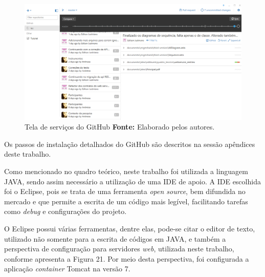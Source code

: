 
\begin{figure}[h!]
	\centerline{\includegraphics[scale=0.35]{./imagens/github.jpg}}
	\caption[Tela de serviços do GitHub ]
	{Tela de serviços do GitHub \textbf{Fonte:} Elaborado pelos autores.}
	\label{fig:exemplo1}
\end{figure}

\par Os passos de instalação detalhados do GitHub são descritos na sessão apêndices deste trabalho.

\par Como mencionado no quadro teórico, neste trabalho foi utilizada a linguagem JAVA, sendo assim necessário a utilização de uma IDE de apoio. A IDE escolhida foi o Eclipse, pois se trata de uma ferramenta \textit{open source}, bem difundida no mercado e que permite a escrita de um código mais legível, facilitando tarefas como \textit{debug} e configurações do projeto.

\par O Eclipse possui várias ferramentas, dentre elas, pode-se citar o editor de texto, utilizado não somente para a escrita de códigos em JAVA, e também a perspectiva de configuração para servidores \textit{web}, utilizada neste trabalho, conforme apresenta a Figura 21. Por meio desta perspectiva, foi configurada a aplicação \textit{container} Tomcat na versão 7.

